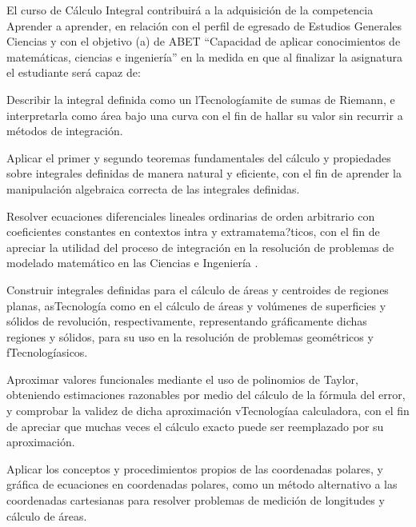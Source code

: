 \begin{syllabus}


\begin{justification}
El curso de Cálculo Integral contribuirá a la adquisición de la competencia Aprender a aprender, en relación con el perfil de egresado de Estudios Generales Ciencias y con el objetivo (a) de ABET ``Capacidad de aplicar conocimientos de matemáticas, ciencias e ingeniería'' en la medida en que al finalizar la asignatura el estudiante será capaz de:
\end{justification}

\begin{goals}
\item Describir la integral definida como un lTecnologíamite de sumas de Riemann, e interpretarla como área bajo una curva con el fin de hallar su valor sin recurrir a métodos de integración.
\item Aplicar el primer y segundo teoremas fundamentales del cálculo y propiedades sobre integrales definidas de manera natural y eficiente, con el fin de aprender la manipulación algebraica correcta de las integrales definidas.
\item Resolver ecuaciones diferenciales lineales ordinarias de orden arbitrario con coeficientes constantes en contextos intra y extramatema?ticos, con el fin de apreciar la utilidad del proceso de integración en la resolución de problemas de modelado matemático en las Ciencias e Ingeniería .
\item Construir integrales definidas para el cálculo de áreas y centroides de regiones planas, asTecnología como en el cálculo de áreas y volúmenes de superficies y sólidos de revolución, respectivamente, representando gráficamente dichas regiones y sólidos, para su uso en la resolución de problemas geométricos y fTecnologíasicos.
\item Aproximar valores funcionales mediante el uso de polinomios de Taylor, obteniendo estimaciones razonables por medio del cálculo de la fórmula del error, y comprobar la validez de dicha aproximación vTecnologíaa calculadora, con el fin de apreciar que muchas veces el cálculo exacto puede ser reemplazado por su aproximación.
\item Aplicar los conceptos y procedimientos propios de las coordenadas polares, y gráfica de ecuaciones en coordenadas polares, como un método alternativo a las coordenadas cartesianas para resolver problemas de medición de longitudes y cálculo de áreas.


\end{goals}
\end{syllabus}
